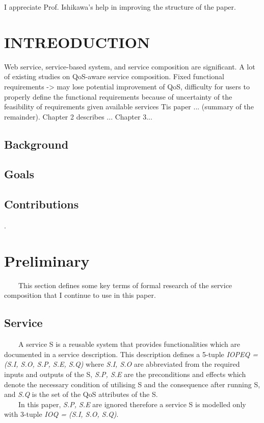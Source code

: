 \documentclass[senior,final,11pt]{iscs-thesis}
\begin{document}
\begin{acknowledge}
I appreciate Prof. Ishikawa's help in improving the structure of the paper.
\end{acknowledge}

\frontmatter 
\tableofcontents
\mainmatter 

\chapter{INTREODUCTION}
Web service, service-based system, and service composition are significant.
A lot of existing studies on QoS-aware service composition.
Fixed functional requirements -> may lose potential improvement of QoS, difficulty for users to properly define the functional requirements because of uncertainty of the feasibility of requirements given available services
Tis paper ... (summary of the remainder).
Chapter 2 describes ... Chapter 3...
\section{Background}
\section{Goals}
\section{Contributions}
\cite{4065825}. 
\chapter{Preliminary}%
~~~~This section defines some key terms of formal research of the service composition that I continue to use in this paper.
\section{Service}
~~~~A service S is a reusable system that provides functionalities which are documented in a service description. This description defines a 5-tuple {\em IOPEQ = (S.I, S.O, S.P, S.E, S.Q)} where {\em S.I, S.O} are abbreviated from the required inputs and outputs of the S, {\em S.P, S.E} are the preconditions and effects which denote the necessary condition of utilising S and the consequence after running S, and {\em S.Q} is the set of the QoS attributes of the S. \\
~~~~In this paper, {\em S.P, S.E} are ignored therefore a service S is modelled only with 3-tuple {\em IOQ = (S.I, S.O, S.Q)}.
\end{document}
